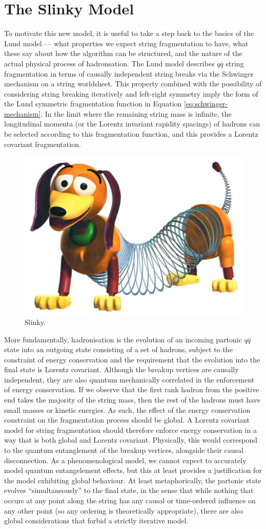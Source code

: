 \documentclass[12pt,a4paper]{report}
\begin{document}
\section{The Slinky Model}
To motivate this new model, it is useful to take a step back to the basics of the Lund model --- what properties we expect string fragmentation to have, what these say about how the algorithm can be structured, and the nature of the actual physical process of hadronsation. The Lund model describes $q\bar{q}$ string fragmentation in terms of causally independent string breaks via the Schwinger mechanism on a string worldsheet. This property combined with the possibility of considering string breaking iteratively and left-right symmetry imply the form of the Lund symmetric fragmentation function in Equation \eqref{eq:schwinger-mechanism}. In the limit where the remaining string mass is infinite, the longitudinal momenta (or the Lorentz invariant rapidity spacings) of hadrons can be selected according to this fragmentation function, and this provides a Lorentz covariant fragmentation.

\begin{figure}
  \centering
  \includegraphics[width=0.4\linewidth]{figures/slinky.png}
  \caption{Slinky.}
  \label{fig:slinky}
\end{figure}

More fundamentally, hadronisation is the evolution of an incoming partonic $q\bar{q}$ state into an outgoing state consisting of a set of hadrons, subject to the constraint of energy conservation and the requirement that the evolution into the final state is Lorentz covariant. Although the breakup vertices are causally independent, they are also quantum mechanically correlated in the enforcement of energy conservation. If we observe that the first rank hadron from the positive end takes the majority of the string mass, then the rest of the hadrons must have small masses or kinetic energies. As such, the effect of the energy conservation constraint on the fragmentation process should be global. A Lorentz covariant model for string fragmentation should therefore enforce energy conservation in a way that is both global and Lorentz covariant. Physically, this would correspond to the quantum entanglement of the breakup vertices, alongside their causal disconnection. As a phenomenological model, we cannot expect to accurately model quantum entangelement effects, but this at least provides a justification for the model exhibiting global behaviour. At least metaphorically, the partonic state evolves ``simultaneously'' to the final state, in the sense that while nothing that occurs at any point along the string has any causal or time-ordered influence on any other point (so any ordering is theoretically appropriate), there are also global considerations that forbid a strictly iterative model.
\end{document}
